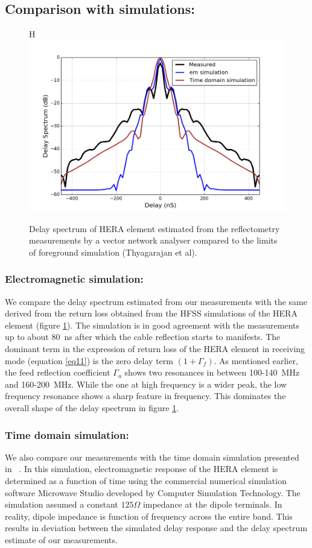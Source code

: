\documentclass[twocolumn]{emulateapj}
\begin{document}
  \subsection{Comparison with simulations:}
  \begin{figure}{H}
  \centering
  \includegraphics[width=\linewidth]{GB_reflectometry_part3/plot/simulation_comparison2.png}
  \caption{Delay spectrum of HERA element estimated from the reflectometry measurements by a vector network analyser compared to the limits of foreground simulation (Thyagarajan et al).}
   \label{fig:sim_em}
   \end{figure}
 \subsubsection{Electromagnetic simulation:}  
We compare the delay spectrum estimated from our measurements with the same derived from the return loss obtained from the HFSS simulations of the HERA element (figure \ref{fig:sim_em}). The simulation is in good agreement with the measurements up to about 80~ns after which the cable reflection starts to manifests. The dominant term in the expression of  return loss of the HERA element in
    receiving mode (equation \ref{eq11}) is the zero delay term $(1+\Gamma_{f})$. As
    mentioned earlier, the feed reflection coefficient $\Gamma_{a}$ shows two
    resonances in between 100-140~MHz and 160-200~MHz. While the one at high
    frequency is a wider peak, the low frequency resonance shows a sharp feature in
    frequency. This dominates the overall shape of the delay spectrum in figure
    \ref{fig:sim_em}.\\
  \subsubsection{Time domain simulation:}  
    We also compare our measurements with the time domain simulation presented in ~\cite{Ewall-Wice_et_al2016}. In this simulation, electromagnetic response of the HERA element is determined as a function of time using the commercial numerical simulation software Microwave Studio developed by Computer Simulation Technology. The simulation assumed a constant $125\Omega$ impedance at the dipole terminals. In reality, dipole impedance is function of frequency across the entire band. This results in deviation between the simulated delay response and the delay spectrum estimate of our measurements. \\
\end{document}
